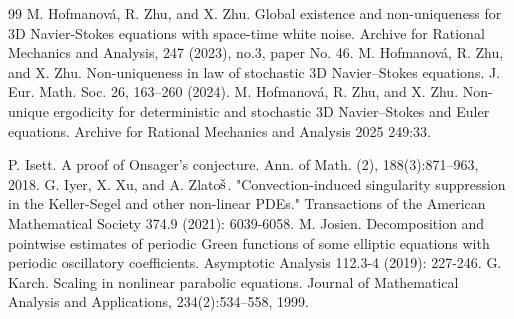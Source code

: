 \documentclass[UTF-8,reqno]{amsart}
\numberwithin{equation}{section}
\theoremstyle{definition}
\begin{document}
\begin{thebibliography}{99}
M. Hofmanov\'a, R. Zhu, and X. Zhu. Global existence and non-uniqueness for 3D Navier-Stokes equations with space-time white noise.  Archive for Rational Mechanics and Analysis, 247 (2023), no.3, paper No. 46.
M. Hofmanov\'a, R. Zhu, and X. Zhu. Non-uniqueness in law of stochastic 3D Navier–Stokes equations. J. Eur. Math. Soc. 26, 163–260 (2024).
M. Hofmanov\'a, R. Zhu, and X. Zhu. Non-unique ergodicity for deterministic and stochastic 3D Navier--Stokes and Euler equations. Archive for Rational Mechanics and Analysis 2025 249:33.

P. Isett. A proof of Onsager’s conjecture. Ann. of Math. (2), 188(3):871–963, 2018.
G. Iyer, X. Xu, and A. Zlato$\rm \check s$. "Convection-induced singularity suppression in the Keller-Segel and other non-linear PDEs." Transactions of the American Mathematical Society 374.9 (2021): 6039-6058.
M. Josien. Decomposition and pointwise estimates of periodic Green functions of some elliptic equations with periodic oscillatory coefficients. Asymptotic Analysis 112.3-4 (2019): 227-246.
 G. Karch. Scaling in nonlinear parabolic equations. Journal of Mathematical Analysis and Applications, 234(2):534–558, 1999.
 

\end{thebibliography}
\end{document}
